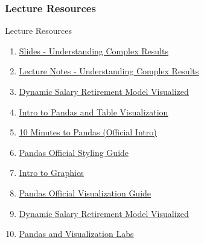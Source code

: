 \documentclass[handout, 11pt]{beamer}
\begin{document}
\begin{frame}
\frametitle{Lecture Resources}
{
\begin{block}{Lecture Resources}
\begin{enumerate}
\item \textcolor{blue}{\underline{\href{https://nickderobertis.github.io/fin-model-course/\_static/generated/pdfs/S6 Understanding Complex Results.pdf}{Slides - Understanding Complex Results}}}
\item \textcolor{blue}{\underline{\href{https://nickderobertis.github.io/fin-model-course/\_static/generated/pdfs/LN6 Understanding Complex Results.pdf}{Lecture Notes - Understanding Complex Results}}}
\item \textcolor{blue}{\underline{\href{https://nickderobertis.github.io/fin-model-course/\_static/Examples/Visualization/Excel/Dynamic Salary Retirement Model Visualized.xlsx}{Dynamic Salary Retirement Model Visualized}}}
\item \textcolor{blue}{\underline{\href{https://nickderobertis.github.io/fin-model-course/\_static/Examples/Visualization/Python/Intro to Pandas and Table Visualization.ipynb}{Intro to Pandas and Table Visualization}}}
\item \textcolor{blue}{\underline{\href{https://pandas.pydata.org/pandas-docs/stable/user\_guide/10min.html}{10 Minutes to Pandas (Official Intro)}}}
\item \textcolor{blue}{\underline{\href{https://pandas.pydata.org/pandas-docs/stable/user\_guide/style.html}{Pandas Official Styling Guide}}}
\item \textcolor{blue}{\underline{\href{https://nickderobertis.github.io/fin-model-course/\_static/Examples/Visualization/Python/Intro to Graphics.ipynb}{Intro to Graphics}}}
\item \textcolor{blue}{\underline{\href{https://pandas.pydata.org/pandas-docs/stable/user\_guide/visualization.html}{Pandas Official Visualization Guide}}}
\item \textcolor{blue}{\underline{\href{https://nickderobertis.github.io/fin-model-course/\_static/Examples/Visualization/Python/Dynamic Salary Retirement Model Visualized.ipynb}{Dynamic Salary Retirement Model Visualized}}}
\item \textcolor{blue}{\underline{\href{https://nickderobertis.github.io/fin-model-course/\_static/Materials for Lab Exercises/Visualization/Pandas and Visualization Labs.ipynb}{Pandas and Visualization Labs}}}
\end{enumerate}
\vfill
\end{block}
}
\label{frames:resources}
\end{frame}
\end{document}
